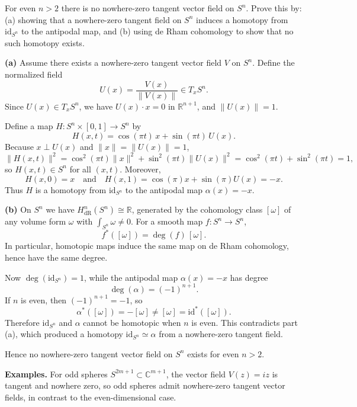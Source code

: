 \begin{problem}
\label{prob:cp-vii-0036}
For even $n>2$ there is no nowhere-zero tangent vector field on $S^n$.
Prove this by:
(a) showing that a nowhere-zero tangent field on $S^n$ induces a homotopy from $\mathrm{id}_{S^n}$ to the antipodal map,
and (b) using de Rham cohomology to show that no such homotopy exists.
\end{problem}

\begin{solution}
\textbf{(a)} Assume there exists a nowhere-zero tangent vector field $V$ on $S^n$.
Define the normalized field
\[
U(x)=\frac{V(x)}{\|V(x)\|}\in T_xS^n.
\]
Since $U(x)\in T_xS^n$, we have $U(x)\cdot x=0$ in $\mathbb{R}^{n+1}$, and $\|U(x)\|=1$.

Define a map $H:S^n\times[0,1]\to S^n$ by
\[
H(x,t)=\cos(\pi t)\,x+\sin(\pi t)\,U(x).
\]
Because $x\perp U(x)$ and $\|x\|=\|U(x)\|=1$,
\[
\|H(x,t)\|^2=\cos^2(\pi t)\|x\|^2+\sin^2(\pi t)\|U(x)\|^2
=\cos^2(\pi t)+\sin^2(\pi t)=1,
\]
so $H(x,t)\in S^n$ for all $(x,t)$.
Moreover,
\[
H(x,0)=x \quad\text{and}\quad H(x,1)=\cos(\pi)x+\sin(\pi)U(x)=-x.
\]
Thus $H$ is a homotopy from $\mathrm{id}_{S^n}$ to the antipodal map $\alpha(x)=-x$.

\textbf{(b)} On $S^n$ we have $H^n_{\mathrm{dR}}(S^n)\cong \mathbb{R}$, generated by the cohomology class $[\omega]$
of any volume form $\omega$ with $\int_{S^n}\omega\neq 0$.
For a smooth map $f:S^n\to S^n$,
\[
f^*([\omega])=\deg(f)\,[\omega].
\]
In particular, homotopic maps induce the same map on de Rham cohomology, hence have the same degree.

Now $\deg(\mathrm{id}_{S^n})=1$, while the antipodal map $\alpha(x)=-x$ has degree
\[
\deg(\alpha)=(-1)^{n+1}.
\]
If $n$ is even, then $(-1)^{n+1}=-1$, so
\[
\alpha^*([\omega])=-[\omega]\neq [\omega]=\mathrm{id}^*([\omega]).
\]
Therefore $\mathrm{id}_{S^n}$ and $\alpha$ cannot be homotopic when $n$ is even.
This contradicts part (a), which produced a homotopy $\mathrm{id}_{S^n}\simeq \alpha$ from a nowhere-zero tangent field.

Hence no nowhere-zero tangent vector field on $S^n$ exists for even $n>2$.

\medskip
\textbf{Examples.}
For odd spheres $S^{2m+1}\subset \mathbb{C}^{m+1}$, the vector field $V(z)=iz$ is tangent and nowhere zero, so odd spheres admit
nowhere-zero tangent vector fields, in contrast to the even-dimensional case.
\end{solution}

